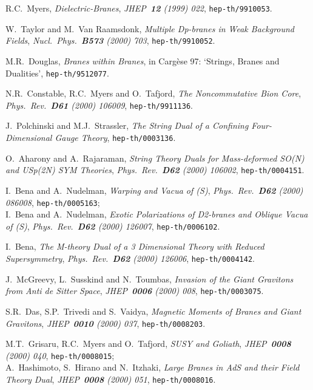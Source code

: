 \documentclass[12pt,a4paper]{article}
\begin{document}
\begin{thebibliography}{99}

R.C.~Myers, {\sl Dielectric-Branes}, {\it JHEP~{\bf 12} (1999) 022}, 
{\tt hep-th/9910053}.

W.~Taylor and M.~Van Raamsdonk, {\sl Multiple Dp-branes in Weak
Background Fields}, {\it Nucl.~Phys.~{\bf B573} (2000) 703},
{\tt hep-th/9910052}.

M.R.~Douglas, {\sl Branes within Branes}, in Carg\`ese 97: `Strings,
Branes and Dualities', {\tt hep-th/9512077}.

N.R.~Constable, R.C.~Myers and O.~Tafjord, {\sl The Noncommutative Bion 
Core}, {\it Phys.~Rev.~{\bf D61} (2000) 106009},
{\tt hep-th/9911136}. 

J.~Polchinski and M.J.~Strassler, {\sl The String Dual of a Confining
Four-Dimensional Gauge Theory}, {\tt hep-th/0003136}.

O.~Aharony and A.~Rajaraman, {\sl String Theory Duals for Mass-deformed
SO(N) and USp(2N) \coordHE{} SYM Theories}, {\it Phys.~Rev.~{\bf D62}
(2000) 106002}, {\tt hep-th/0004151}. 

I.~Bena and A.~Nudelman, {\sl Warping and Vacua of 
(S)\coordHE{}}, {\it Phys.~Rev.~{\bf D62} (2000) 086008},
{\tt hep-th/0005163};\\
I.~Bena and A.~Nudelman, {\sl Exotic Polarizations of D2-branes and
Oblique Vacua of (S)\coordHE{}}, {\it Phys.~Rev.~{\bf D62} (2000)
126007}, {\tt hep-th/0006102}.

I.~Bena, {\sl The M-theory Dual of a 3 Dimensional Theory with
Reduced Supersymmetry}, {\it Phys.~Rev.~{\bf D62} (2000) 126006},
{\tt hep-th/0004142}.

J.~McGreevy, L.~Susskind and N.~Toumbas, {\sl Invasion of the Giant
Gravitons from Anti de Sitter Space}, {\it JHEP~{\bf 0006}
(2000) 008}, {\tt hep-th/0003075}.

S.R.~Das, S.P.~Trivedi and S.~Vaidya, {\sl Magnetic Moments of Branes
and Giant Gravitons}, {\it JHEP~{\bf 0010} (2000) 037},
{\tt hep-th/0008203}.

M.T.~Grisaru, R.C.~Myers and O.~Tafjord, {\sl SUSY and Goliath},
{\it JHEP~{\bf 0008} (2000) 040}, {\tt hep-th/0008015};\\
A.~Hashimoto, S.~Hirano and N.~Itzhaki, {\sl Large Branes in AdS and
their Field Theory Dual}, {\it JHEP~{\bf 0008} (2000) 051},
{\tt hep-th/0008016}.


\end{thebibliography}
\end{document}
